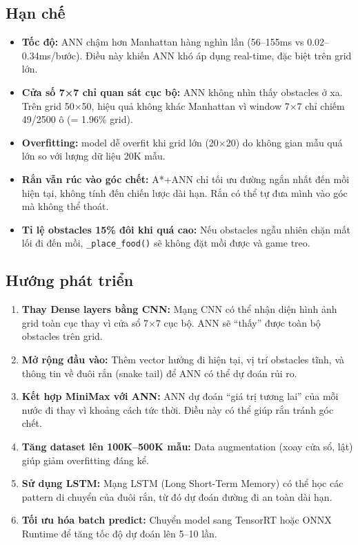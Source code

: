 \documentclass[12pt,a4paper]{article}
\begin{document}
\subsection{Hạn chế}

\begin{itemize}
    \item \textbf{Tốc độ:} ANN chậm hơn Manhattan hàng nghìn lần (56--155ms vs 0.02--0.34ms/bước). Điều này khiến ANN khó áp dụng real-time, đặc biệt trên grid lớn.
    
    \item \textbf{Cửa số 7×7 chỉ quan sát cục bộ:} ANN không nhìn thấy obstacles ở xa. Trên grid 50×50, hiệu quả không khác Manhattan vì window 7×7 chỉ chiếm 49/2500 ô (= 1.96\% grid).
    
    \item \textbf{Overfitting:} model dễ overfit khi grid lớn (20×20) do không gian mẫu quá lớn so với lượng dữ liệu 20K mẫu.
    
    \item \textbf{Rắn vẫn rúc vào góc chết:} A*+ANN chỉ tối ưu đường ngắn nhất đến mồi hiện tại, không tính đến chiến lược dài hạn. Rắn có thể tự đưa mình vào góc mà không thể thoát.
    
    \item \textbf{Tỉ lệ obstacles 15\% đôi khi quá cao:} Nếu obstacles ngẫu nhiên chặn mất lối đi đến mồi, \lstinline{_place_food()} sẽ không đặt mồi được và game treo.
\end{itemize}

\subsection{Hướng phát triển}

\begin{enumerate}
    \item \textbf{Thay Dense layers bằng CNN:} Mạng CNN có thể nhận diện hình ảnh grid toàn cục thay vì cửa sổ 7×7 cục bộ. ANN sẽ ``thấy'' được toàn bộ obstacles trên grid.
    
    \item \textbf{Mở rộng đầu vào:} Thêm vector hướng đi hiện tại, vị trí obstacles tĩnh, và thông tin về đuôi rắn (snake tail) để ANN có thể dự đoán rủi ro.
    
    \item \textbf{Kết hợp MiniMax với ANN:} ANN dự đoán ``giá trị tương lai'' của mỗi nước đi thay vì khoảng cách tức thời. Điều này có thể giúp rắn tránh góc chết.
    
    \item \textbf{Tăng dataset lên 100K--500K mẫu:} Data augmentation (xoay cửa sổ, lật) giúp giảm overfitting đáng kể.
    
    \item \textbf{Sử dụng LSTM:} Mạng LSTM (Long Short-Term Memory) có thể học các pattern di chuyển của đuôi rắn, từ đó dự đoán đường đi an toàn dài hạn.
    
    \item \textbf{Tối ưu hóa batch predict:} Chuyển model sang TensorRT hoặc ONNX Runtime để tăng tốc độ dự đoán lên 5--10 lần.
\end{enumerate}
\end{document}
